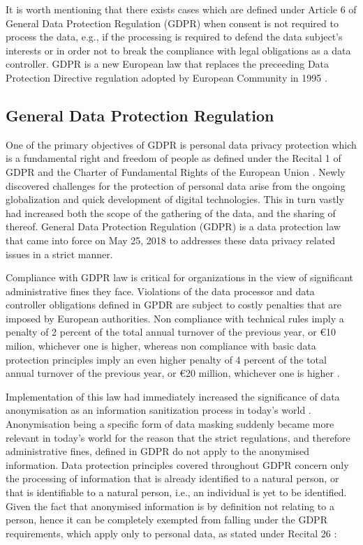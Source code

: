 \documentclass[a4paper,twoside,12pt]{book}
\begin{document}
It is worth mentioning that there exists cases which are defined under Article 6 of General Data Protection Regulation (GDPR) \cite{bib:art6} when consent is not required to process the data, e.g., if the processing is required to defend the data subject's interests or in order not to break the compliance with legal obligations as a data controller. GDPR is a new European law that replaces the preceeding Data Protection Directive regulation adopted by European Community in 1995 \cite{bib:gdpr_practical_guide}. 

\subsection{General Data Protection Regulation}

One of the primary objectives of GDPR is personal data privacy protection which is a fundamental right and freedom of people as defined under the Recital 1 of GDPR \cite{bib:recital1} and the Charter of Fundamental Rights of the European Union \cite{bib:charter}. Newly discovered challenges for the protection of personal data arise from the ongoing globalization and quick development of digital technologies. This in turn vastly had increased both the scope of the gathering of the data, and the sharing of thereof. General Data Protection Regulation (GDPR) is a data protection law that came into force on May 25, 2018 to addresses these data privacy related issues in a strict manner\cite{bib:recital6}.

Compliance with GDPR law is critical for organizations in the view of significant administrative fines they face. Violations of the data processor and data controller obligations defined in GPDR are subject to costly penalties that are imposed by European authorities. Non compliance with technical rules imply a penalty of 2 percent of the total annual turnover of the previous year, or €10 milion, whichever one is higher, whereas non compliance with basic data protection principles imply an even higher penalty of 4 percent of the total annual turnover of the previous year, or €20 million, whichever one is higher \cite{bib:art83}\cite{bib:gdpr_managing_data_risk}.

Implementation of this law had immediately increased the significance of data anonymisation as an information sanitization process in today's world \cite{bib:anonymization_for_research}. Anonymisation being a specific form of data masking suddenly became more relevant in today's world for the reason that the strict regulations, and therefore administrative fines, defined in GDPR do not apply to the anonymised information. Data protection principles covered throughout GDPR concern only the processing of information that is already identified to a natural person, or that is identifiable to a natural person, i.e., an individual is yet to be identified. Given the fact that anonymised information is by definition not relating to a person, hence it can be completely exempted from falling under the GDPR requirements, which apply only to personal data, as stated under Recital 26 \cite{bib:recital26}:
\end{document}

